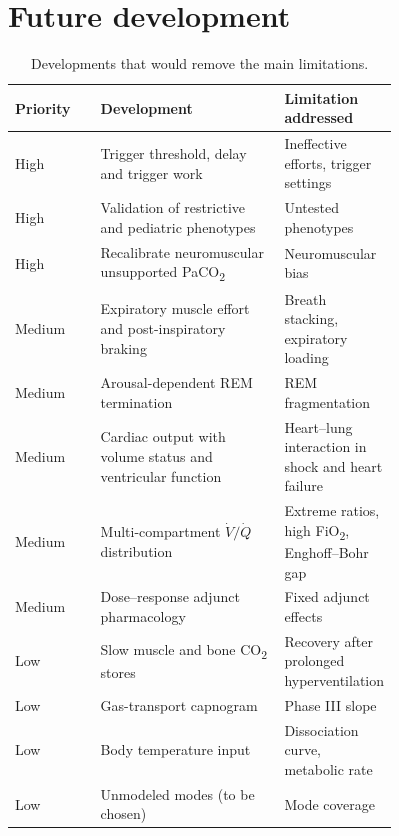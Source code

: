 \section{Future development}
\label{sec:app-fut}
\begin{table}[htbp]\centering\small
\caption{Developments that would remove the main limitations.}
\label{tab:app-fut}
\begin{tabular}{@{}l>{\raggedright\arraybackslash}p{0.48\linewidth}>{\raggedright\arraybackslash}p{0.28\linewidth}@{}}
\toprule Priority & Development & Limitation addressed\\\midrule
High & Trigger threshold, delay and trigger work & Ineffective efforts, trigger settings\\
High & Validation of restrictive and pediatric phenotypes & Untested phenotypes\\
High & Recalibrate neuromuscular unsupported PaCO\textsubscript{2} & Neuromuscular bias\\
Medium & Expiratory muscle effort and post-inspiratory braking & Breath stacking, expiratory loading\\
Medium & Arousal-dependent REM termination & REM fragmentation\\
Medium & Cardiac output with volume status and ventricular function & Heart--lung interaction in shock and heart failure\\
Medium & Multi-compartment $\dot V/\dot Q$ distribution & Extreme ratios, high FiO\textsubscript{2}, Enghoff--Bohr gap\\
Medium & Dose--response adjunct pharmacology & Fixed adjunct effects\\
Low & Slow muscle and bone CO\textsubscript{2} stores & Recovery after prolonged hyperventilation\\
Low & Gas-transport capnogram & Phase III slope\\
Low & Body temperature input & Dissociation curve, metabolic rate\\
Low & Unmodeled modes (to be chosen) & Mode coverage\\\bottomrule
\end{tabular}
\end{table}
